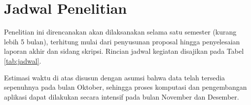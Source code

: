 \documentclass[a4paper]{article}
\theoremstyle{definition} %
\begin{document}
\section{Jadwal Penelitian}

Penelitian ini direncanakan akan dilaksanakan selama satu semester (kurang lebih 5 bulan), terhitung mulai dari penyusunan proposal hingga penyelesaian laporan akhir dan sidang skripsi. Rincian jadwal kegiatan disajikan pada Tabel \ref{tab:jadwal}.

\begin{table}[htbp]
\centering
\caption{Rencana Jadwal Pelaksanaan Penelitian}
\label{tab:jadwal}
\vspace{0.3cm}
\end{table}

Estimasi waktu di atas disusun dengan asumsi bahwa data telah tersedia sepenuhnya pada bulan Oktober, sehingga proses komputasi dan pengembangan aplikasi dapat dilakukan secara intensif pada bulan November dan Desember.

\newpage
\nolinenumbers


\end{document}
